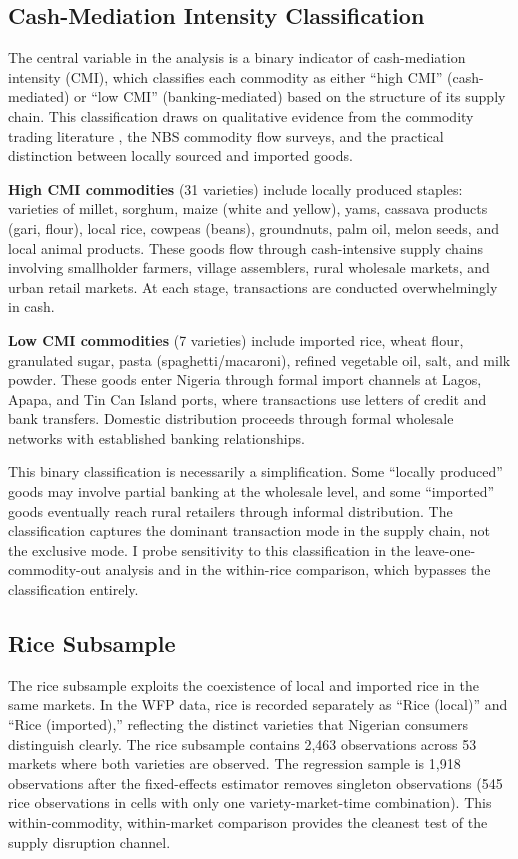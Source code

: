 \documentclass[12pt]{article}
\begin{document}
\subsection{Cash-Mediation Intensity Classification}

The central variable in the analysis is a binary indicator of cash-mediation intensity (CMI), which classifies each commodity as either ``high CMI'' (cash-mediated) or ``low CMI'' (banking-mediated) based on the structure of its supply chain. This classification draws on qualitative evidence from the commodity trading literature \citep{adesina2023, gyimah-brempong2016food, aker2010information}, the NBS commodity flow surveys, and the practical distinction between locally sourced and imported goods.

\textbf{High CMI commodities} (31 varieties) include locally produced staples: varieties of millet, sorghum, maize (white and yellow), yams, cassava products (gari, flour), local rice, cowpeas (beans), groundnuts, palm oil, melon seeds, and local animal products. These goods flow through cash-intensive supply chains involving smallholder farmers, village assemblers, rural wholesale markets, and urban retail markets. At each stage, transactions are conducted overwhelmingly in cash.

\textbf{Low CMI commodities} (7 varieties) include imported rice, wheat flour, granulated sugar, pasta (spaghetti/macaroni), refined vegetable oil, salt, and milk powder. These goods enter Nigeria through formal import channels at Lagos, Apapa, and Tin Can Island ports, where transactions use letters of credit and bank transfers. Domestic distribution proceeds through formal wholesale networks with established banking relationships.

This binary classification is necessarily a simplification. Some ``locally produced'' goods may involve partial banking at the wholesale level, and some ``imported'' goods eventually reach rural retailers through informal distribution. The classification captures the dominant transaction mode in the supply chain, not the exclusive mode. I probe sensitivity to this classification in the leave-one-commodity-out analysis and in the within-rice comparison, which bypasses the classification entirely.

\subsection{Rice Subsample}

The rice subsample exploits the coexistence of local and imported rice in the same markets. In the WFP data, rice is recorded separately as ``Rice (local)'' and ``Rice (imported),'' reflecting the distinct varieties that Nigerian consumers distinguish clearly. The rice subsample contains 2,463 observations across 53 markets where both varieties are observed. The regression sample is 1,918 observations after the fixed-effects estimator removes singleton observations (545 rice observations in cells with only one variety-market-time combination). This within-commodity, within-market comparison provides the cleanest test of the supply disruption channel.
\end{document}
